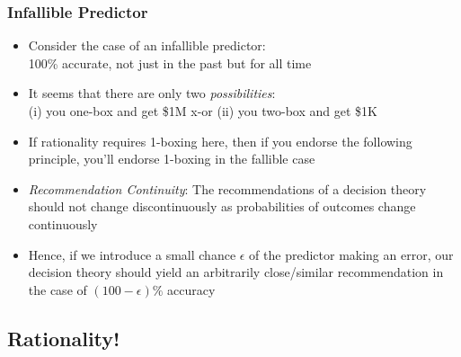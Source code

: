 \begin{frame}
\frametitle{Infallible Predictor}

\begin{itemize}[<+->]

\item Consider the case of an infallible predictor: \\ 100\% accurate, not just in the past but for all time 

\item It seems that there are only two \textit{possibilities}: \\ (i) you one-box and get \$1M x-or (ii) you two-box and get \$1K

\item If rationality requires 1-boxing here, then if you endorse the following principle, you'll endorse 1-boxing in the fallible case 


\item \emph{Recommendation Continuity}: The recommendations of a decision theory should not change discontinuously as probabilities of outcomes change continuously

\item Hence, if we introduce a small chance $\epsilon$ of the predictor making an error, our decision theory should yield an arbitrarily close/similar recommendation in the case of $(100-\epsilon)\% $ accuracy 

\end{itemize}
\end{frame}

\subsection{Rationality!}

